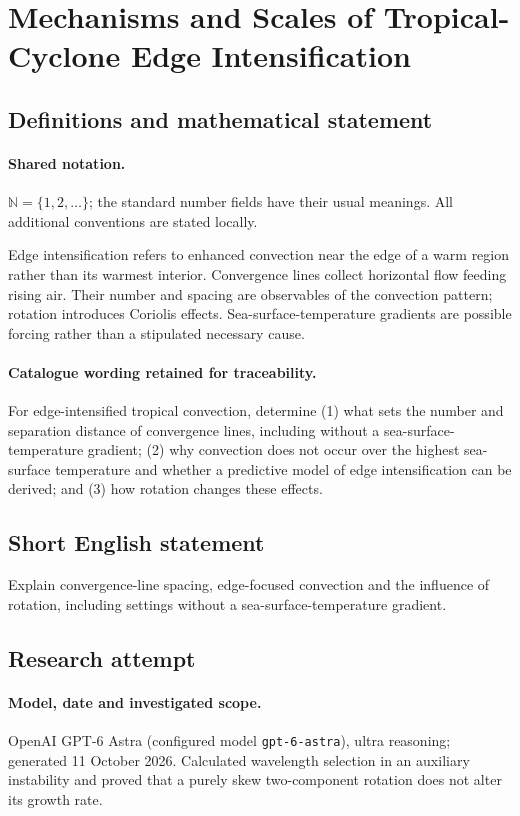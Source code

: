 \documentclass[11pt]{article}
\begin{document}
\section{Mechanisms and Scales of Tropical-Cyclone Edge Intensification}\label{statement}

\subsection{Definitions and mathematical statement}

\paragraph{Shared notation.}$\mathbb N=\{1,2,\ldots\}$; the standard number fields have their usual meanings. All additional conventions are stated locally.


Edge intensification refers to enhanced convection near the edge of a warm region rather than its warmest interior. Convergence lines collect horizontal flow feeding rising air. Their number and spacing are observables of the convection pattern; rotation introduces Coriolis effects. Sea-surface-temperature gradients are possible forcing rather than a stipulated necessary cause.

\paragraph{Catalogue wording retained for traceability.}
For edge-intensified tropical convection, determine (1) what sets the number and separation distance of convergence lines, including without a sea-surface-temperature gradient; (2) why convection does not occur over the highest sea-surface temperature and whether a predictive model of edge intensification can be derived; and (3) how rotation changes these effects.
\subsection{Short English statement}
Explain convergence-line spacing, edge-focused convection and the influence of rotation, including settings without a sea-surface-temperature gradient.
\subsection{Research attempt}
\paragraph{Model, date and investigated scope.}
OpenAI GPT-6 Astra (configured model \texttt{gpt-6-astra}), ultra reasoning; generated 11 October 2026. Calculated wavelength selection in an auxiliary instability and proved that a purely skew two-component rotation does not alter its growth rate.
\end{document}
